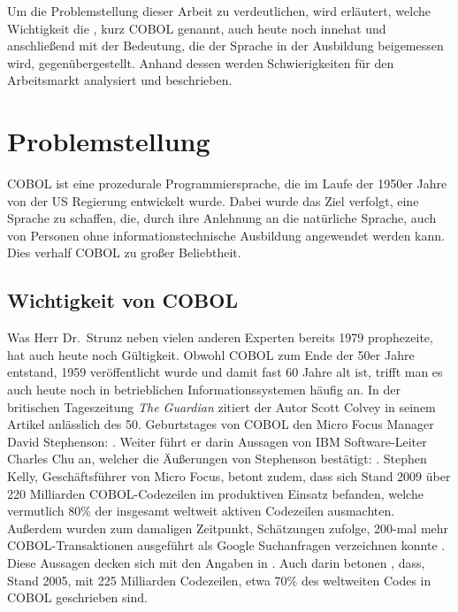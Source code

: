 Um die Problemstellung dieser Arbeit zu verdeutlichen, wird erläutert, welche Wichtigkeit die , kurz COBOL genannt, auch heute noch innehat und anschließend mit der Bedeutung, die der Sprache in der Ausbildung beigemessen wird, gegenübergestellt. Anhand dessen werden Schwierigkeiten für den Arbeitsmarkt analysiert und beschrieben.

\section{Problemstellung}\label{problemstellung}
 COBOL ist eine prozedurale Programmiersprache, die im Laufe der 1950er Jahre von der US Regierung entwickelt wurde. Dabei wurde das Ziel verfolgt, eine Sprache zu schaffen, die, durch ihre Anlehnung an die natürliche Sprache, auch von Personen ohne informationstechnische Ausbildung angewendet werden kann. Dies verhalf COBOL zu großer Beliebtheit.

\subsection*{Wichtigkeit von COBOL}\label{wichtigkeit}
 \cite{_ist_1979}

Was Herr Dr.\  Strunz neben vielen anderen Experten bereits 1979 prophezeite, hat auch heute noch Gültigkeit. Obwohl COBOL zum Ende der 50er Jahre entstand, 1959 veröffentlicht wurde und damit fast 60 Jahre alt ist, trifft man es auch heute noch in betrieblichen Informationssystemen häufig an. In der britischen Tageszeitung \textit{The Guardian} zitiert der Autor Scott Colvey in seinem Artikel \cite{colvey_cobol_2009} anlässlich des 50. Geburtstages von COBOL den Micro Focus Manager David Stephenson: . Weiter führt er darin Aussagen von IBM Software-Leiter Charles Chu an, welcher die Äußerungen von Stephenson bestätigt: . Stephen Kelly, Geschäftsführer von Micro Focus, betont zudem, dass sich Stand 2009 über 220 Milliarden COBOL-Codezeilen im produktiven Einsatz befanden, welche vermutlich 80\% der insgesamt weltweit aktiven Codezeilen ausmachten. Außerdem wurden zum damaligen Zeitpunkt, Schätzungen zufolge, 200-mal mehr COBOL-Transaktionen ausgeführt als Google Suchanfragen verzeichnen konnte \cite{kelly_cobol_2009}. Diese Aussagen decken sich mit den Angaben in . Auch darin betonen \citeauthor{doke_cobol_2005}, dass, Stand 2005, mit 225 Milliarden Codezeilen, etwa 70\% des weltweiten Codes in COBOL geschrieben sind.


